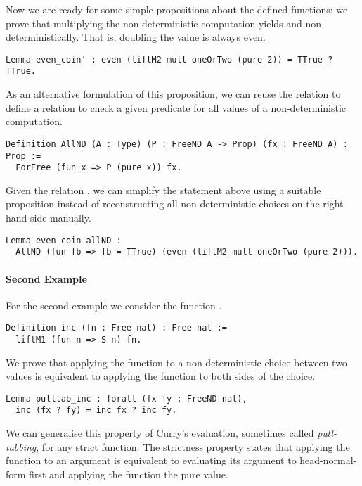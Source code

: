 Now we are ready for some simple propositions about the defined
functions: we prove that multiplying the non-deterministic computation
 yields  and 
non-deterministically.
That is, doubling the value  is always even.

\begin{verbatim}
Lemma even_coin' : even (liftM2 mult oneOrTwo (pure 2)) = TTrue ? TTrue.
\end{verbatim}

As an alternative formulation of this proposition, we can reuse the
relation  to define a relation  to check a
given predicate for all values of a non-deterministic computation.

\begin{verbatim}
Definition AllND (A : Type) (P : FreeND A -> Prop) (fx : FreeND A) : Prop :=
  ForFree (fun x => P (pure x)) fx.
\end{verbatim}

Given the relation , we can simplify the statement above
using a suitable proposition instead of reconstructing all
non-deterministic choices on the right-hand side manually.

\begin{verbatim}
Lemma even_coin_allND :
  AllND (fun fb => fb = TTrue) (even (liftM2 mult oneOrTwo (pure 2))).
\end{verbatim}

\paragraph{Second Example}
For the second example we consider the function .

\begin{verbatim}
Definition inc (fn : Free nat) : Free nat :=
  liftM1 (fun n => S n) fn.
\end{verbatim}

We prove that applying the function  to a non-deterministic
choice between two values is equivalent to applying the function to
both sides of the choice.

\begin{verbatim}
Lemma pulltab_inc : forall (fx fy : FreeND nat),
  inc (fx ? fy) = inc fx ? inc fy.
\end{verbatim}

We can generalise this property of Curry's evaluation, sometimes
called \emph{pull-tabbing}, for any strict function.
The strictness property states that applying the function to an
argument is equivalent to evaluating its argument to head-normal-form
first and applying the function the pure value.


